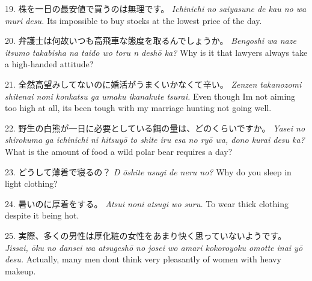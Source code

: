 \par{19. 株を一日の最安値で買うのは無理です。 \hfill\break
 \emph{Ichinichi no saiyasune de kau no wa muri desu. }\hfill\break
It\textquotesingle s impossible to buy stocks at the lowest price of the day. }
 
\par{20. 弁護士は何故いつも高飛車な態度を取るんでしょうか。 \hfill\break
 \emph{Bengoshi wa naze itsumo takabisha na taido wo toru n deshō ka? }\hfill\break
Why is it that lawyers always take a high-handed attitude? }
 
\par{21. 全然高望みしてないのに婚活がうまくいかなくて辛い。 \hfill\break
 \emph{Zenzen takanozomi shitenai noni konkatsu ga umaku ikanakute tsurai. \hfill\break
 }Even though I\textquotesingle m not aiming too high at all, it\textquotesingle s been tough with my marriage hunting not going well. }
 
\par{22. 野生の白熊が一日に必要としている餌の量は、どのくらいですか。 \hfill\break
 \emph{Yasei no shirokuma ga ichinichi ni hitsuyō to shite iru esa no ryō wa, dono kurai desu ka? }\hfill\break
What is the amount of food a wild polar bear requires a day? }
 
\par{23. どうして薄着で寝るの？ \hfill\break
 \emph{D }\emph{ōshite usugi de neru no? } \hfill\break
Why do you sleep in light clothing? }
 
\par{24. 暑いのに厚着をする。 \hfill\break
 \emph{Atsui noni atsugi wo suru. }\hfill\break
To wear thick clothing despite it being hot. }
 
\par{25. 実際、多くの男性は厚化粧の女性をあまり快く思っていないようです。 \hfill\break
 \emph{Jissai, ōku no dansei wa atsugeshō no josei wo amari kokoroyoku omotte inai yō desu. \hfill\break
 }Actually, many men don\textquotesingle t think very pleasantly of women with heavy makeup. }
    